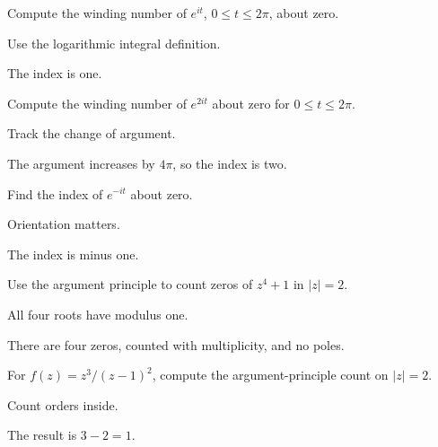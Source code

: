 \begin{exercise}\label{exr:iv12-expand-01}
Compute the winding number of \(e^{it}\), \(0\le t\le2\pi\), about zero.
\end{exercise}
\begin{hint}
Use the logarithmic integral definition.
\end{hint}
\begin{solution}
The index is one.
\end{solution}

\begin{exercise}\label{exr:iv12-expand-02}
Compute the winding number of \(e^{2it}\) about zero for \(0\le t\le2\pi\).
\end{exercise}
\begin{hint}
Track the change of argument.
\end{hint}
\begin{solution}
The argument increases by \(4\pi\), so the index is two.
\end{solution}

\begin{exercise}\label{exr:iv12-expand-03}
Find the index of \(e^{-it}\) about zero.
\end{exercise}
\begin{hint}
Orientation matters.
\end{hint}
\begin{solution}
The index is minus one.
\end{solution}

\begin{exercise}\label{exr:iv12-expand-04}
Use the argument principle to count zeros of \(z^4+1\) in \(|z|=2\).
\end{exercise}
\begin{hint}
All four roots have modulus one.
\end{hint}
\begin{solution}
There are four zeros, counted with multiplicity, and no poles.
\end{solution}

\begin{exercise}\label{exr:iv12-expand-05}
For \(f(z)=z^3/(z-1)^2\), compute the argument-principle count on \(|z|=2\).
\end{exercise}
\begin{hint}
Count orders inside.
\end{hint}
\begin{solution}
The result is \(3-2=1\).
\end{solution}

